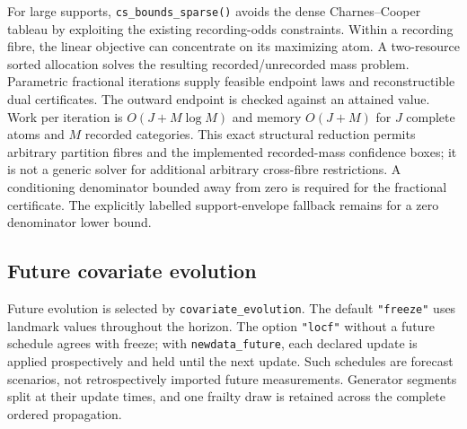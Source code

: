 \documentclass[article,nojss]{jss}
\newcommand{\code}[1]{\texttt{#1}}
\begin{document}
For large supports, \code{cs\_bounds\_sparse()} avoids the dense Charnes--Cooper tableau by exploiting the existing recording-odds constraints. Within a recording fibre, the linear objective can concentrate on its maximizing atom. A two-resource sorted allocation solves the resulting recorded/unrecorded mass problem. Parametric fractional iterations \citep{Dinkelbach1967} supply feasible endpoint laws and reconstructible dual certificates. The outward endpoint is checked against an attained value. Work per iteration is $O(J+M\log M)$ and memory $O(J+M)$ for $J$ complete atoms and $M$ recorded categories. This exact structural reduction permits arbitrary partition fibres and the implemented recorded-mass confidence boxes; it is not a generic solver for additional arbitrary cross-fibre restrictions. A conditioning denominator bounded away from zero is required for the fractional certificate. The explicitly labelled support-envelope fallback remains for a zero denominator lower bound.

\subsection{Future covariate evolution}
Future evolution is selected by \code{covariate\_evolution}. The default \code{"freeze"} uses landmark values throughout the horizon. The option \code{"locf"} without a future schedule agrees with freeze; with \code{newdata\_future}, each declared update is applied prospectively and held until the next update. Such schedules are forecast scenarios, not retrospectively imported future measurements. Generator segments split at their update times, and one frailty draw is retained across the complete ordered propagation.
\end{document}

